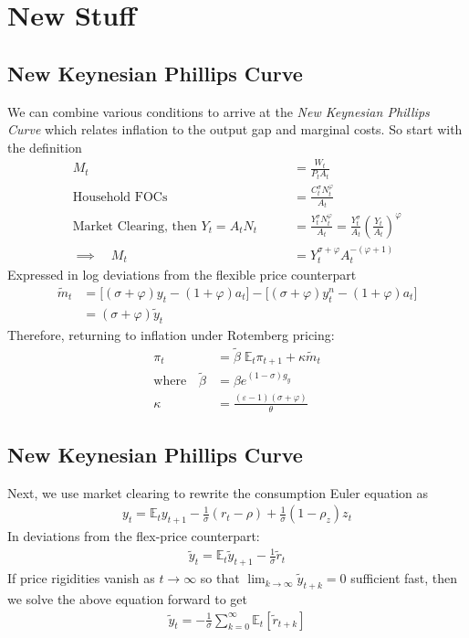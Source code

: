 \documentclass[12pt]{article}
\theoremstyle{plain}
\theoremstyle{definition}
\theoremstyle{remark}
\newcommand{\ra}{\rightarrow}
\newcommand{\E}{\mathbb{E}}
\begin{document}
\clearpage
\section{New Stuff}

\clearpage
\subsection{New Keynesian Phillips Curve}

We can combine various conditions to arrive at the
\emph{New Keynesian Phillips Curve} which relates inflation to the
output gap and marginal costs. So start with the definition
\begin{align*}
  M_t
  &= \frac{W_t}{P_tA_t} \\
  \text{Household FOCs}\qquad
  &= \frac{C_t^\sigma N_t^\varphi}{A_t}
  \\
  \text{Market Clearing, then $Y_t=A_tN_t$}\qquad
  &= \frac{Y_t^\sigma N_t^\varphi}{A_t}
  =
  \frac{Y_t^\sigma}{A_t}
  \left(
  \frac{Y_t}{A_t}
  \right)^\varphi \\
  \implies\quad
  M_t &= Y_t^{\sigma+\varphi}A_t^{-(\varphi+1)}
\end{align*}
Expressed in log deviations from the flexible price counterpart
\begin{align*}
  \tilde{m}_t
  &=
  \big[(\sigma+\varphi)y_t-(1+\varphi)a_t\big]
  -
  \big[(\sigma+\varphi)y^n_t-(1+\varphi)a_t\big]
  \\
  &=
  \left(\sigma+\varphi\right)
  \tilde{y}_t
\end{align*}
Therefore, returning to inflation under Rotemberg pricing:
\begin{align*}
  \pi_t &= \tilde{\beta}\;\E_t\pi_{t+1} + \kappa \tilde{m}_t \\
  \text{where}\quad
  \tilde{\beta} &=
    \beta e^{(1-\sigma)g_y} \\
  \kappa &=
    \frac{(\varepsilon-1)(\sigma+\varphi)}{\theta}
\end{align*}


\subsection{New Keynesian Phillips Curve}

Next, we use market clearing to rewrite the consumption Euler equation
as
\begin{align*}
  y_t = \E_ty_{t+1}
  - \frac{1}{\sigma}(r_t-\rho)
  + \frac{1}{\sigma}(1-\rho_z)z_t
\end{align*}
In deviations from the flex-price counterpart:
\begin{align*}
  \tilde{y}_t
  = \E_t\tilde{y}_{t+1}
  - \frac{1}{\sigma}\tilde{r}_t
\end{align*}
If price rigidities vanish as $t\ra\infty$ so that
$\lim_{k\ra\infty}\tilde{y}_{t+k}=0$ sufficient fast, then we solve
the above equation forward to get
\begin{align*}
  \tilde{y}_t
  =
  - \frac{1}{\sigma}
  \sum_{k=0}^\infty \E_t[\tilde{r}_{t+k}]
\end{align*}
\end{document}
